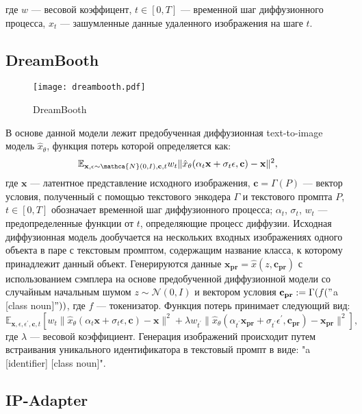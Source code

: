 \documentclass{article}
\begin{document}
где $w$ --- весовой коэффицент, $t \in [0, T]$ --- временной шаг диффузионного процесса, $x_t$ --- зашумленные данные удаленного изображения на шаге $t$.

\subsection{DreamBooth}
\begin{figure}[H]
    \centering
    \texttt{[image: dreambooth.pdf]}
    \caption{DreamBooth}
    \label{fig:simple}
\end{figure}

В основе данной модели лежит предобученная диффузионная text-to-image модель $\hat{x}_{\theta}$, функция потерь которой определяется как:
\begin{equation}
\mathbb{E}_{\mathbf{x}, \epsilon \sim \mathca{N}(0, I), \mathbf{c}, t} w_t \|\hat{x}_{\theta}(\alpha_t \mathbf{x} + \sigma_t \epsilon, \mathbf{c}) - \mathbf{x}\|^2,
\end{equation}
где $\mathbf{x}$ --- латентное представление исходного изображения, $\mathbf{c} = \Gamma(P)$ --- вектор условия, полученный с помощью текстового энкодера $\Gamma$ и текстового промпта $P$, $t \in [0, T]$ обозначает временной шаг диффузионного процесса; $\alpha_t$, $\sigma_t$, $w_t$ --- предопределенные функции от $t$, определяющие процесс диффузии. 
Исходная диффузионная модель дообучается на нескольких входных изображениях одного объекта в паре с текстовым промптом, содержащим название класса, к которому принадлежит данный объект. Генерируются данные  $\mathbf{x_{pr}} = \hat{x}(z, \mathbf{c_{pr}})$ с использованием сэмплера на основе предобученной диффузионной модели со случайным начальным шумом $z \sim \mathcal{N}(0, I)$ и вектором условия $\mathbf{c_{pr}} := \Gamma(f("$a [class  noun$]"))$, где $f$ --- токенизатор. Функция потерь принимает следующий вид:
\begin{equation}
\mathbb{E}_{\mathbf{x}, \epsilon, \epsilon^{\prime}, \mathbf{c}, t} [w_t \|\hat{x}_{\theta}(\alpha_t \mathbf{x} + \sigma_t \epsilon, \mathbf{c}) - \mathbf{x}\|^2 + \lambda w_{t^{\prime}} \|\hat{x}_{\theta}(\alpha_{t^{\prime}} \mathbf{x_{pr}} + \sigma_{t^{\prime}} \epsilon^{\prime}, \mathbf{c_{pr}}) - \mathbf{x_{pr}}\|^2],
\end{equation}
где $\lambda$ --- весовой коэффициент.
Генерация изображений происходит путем встраивания уникального идентификатора в текстовый промпт в виде: "a [identifier] [class noun]". 


\subsection{IP-Adapter}
\end{document}
